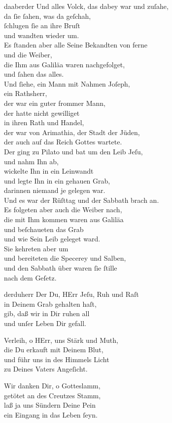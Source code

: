 \documentclass[tocstyle=ref-genre]{ees}
\begin{document}
{\begin{movement}{daaberder}
  \voice[Evangelist]
  Und alles Volck, das dabey war und zuſahe,\\
  da ſie ſahen, was da geſchah,\\
  ſchlugen ſie an ihre Bruſt\\
  und wandten wieder um.\\
  Es ſtanden aber alle Seine Bekandten von ferne\\
  und die Weiber,\\
  die Ihm aus Galiläa waren nachgefolget,\\
  und ſahen das alles.\\
  Und ſiehe, ein Mann mit Nahmen Joſeph,\\
  ein Rathsherr,\\
  der war ein guter frommer Mann,\\
  der hatte nicht gewilliget\\
  in ihren Rath und Handel,\\
  der war von Arimathia, der Stadt der Jüden,\\
  der auch auf das Reich Gottes wartete.\\
  Der ging zu Pilato und bat um den Leib Jeſu,\\
  und nahm Ihn ab,\\
  wickelte Ihn in ein Leinwandt\\
  und legte Ihn in ein gehauen Grab,\\
  darinnen niemand je gelegen war.\\
  Und es war der Rüſttag und der Sabbath brach an.\\
  Es folgeten aber auch die Weiber nach,\\
  die mit Ihm kommen waren aus Galiläa\\
  und beſchaueten das Grab\\
  und wie Sein Leib geleget ward.\\
  Sie kehreten aber um\\
  und bereiteten die Specerey und Salben,\\
  und den Sabbath über waren ſie ſtille\\
  nach dem Geſetz.
\end{movement}

\begin{movement}{derduherr}
  \voice[Chor]
  Der Du, HErr Jeſu, Ruh und Raſt\\
  in Deinem Grab gehalten haſt,\\
  gib, daß wir in Dir ruhen all\\
  und unſer Leben Dir gefall.

  Verleih, o HErr, uns Stärk und Muth,\\
  die Du erkauft mit Deinem Blut,\\
  und führ uns in des Himmels Licht\\
  zu Deines Vaters Angeſicht.

  Wir danken Dir, o Gotteslamm,\\
  getötet an des Creutzes Stamm,\\
  laß ja uns Sündern Deine Pein\\
  ein Eingang in das Leben ſeyn.
\end{movement}
}

\eesScore
\end{document}
